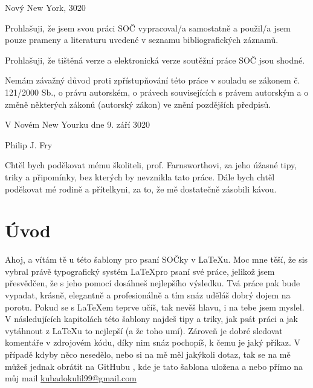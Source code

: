\documentclass[12pt, a4paper,
 twoside,        %
 openright
]{report}
\begin{document}
\noindent Nový New York, 3020

\cleardoublepage


\noindent Prohlašuji, že jsem svou práci SOČ vypracoval/a samostatně a použil/a jsem pouze prameny a literaturu uvedené v seznamu bibliografických záznamů.

\noindent Prohlašuji, že tištěná verze a elektronická verze soutěžní práce SOČ jsou shodné. 

\noindent Nemám závažný důvod proti zpřístupňování této práce v souladu se zákonem č. 121/2000 Sb., o právu autorském, o právech souvisejících s právem autorským a o změně některých zákonů (autorský zákon) ve znění pozdějších předpisů. 

\vspace{24 pt}

\noindent V Novém New Yourku dne 9. září 3020 \dotfill{} 

\hspace{8cm} Philip J. Fry

\cleardoublepage

\vspace*{0.8\textheight}

\noindent
Chtěl bych poděkovat mému školiteli, prof. Farnsworthovi, za jeho úžasné tipy, triky a připomínky, bez kterých by nevznikla tato práce. Dále bych chtěl poděkovat mé rodině a přítelkyni, za to, že mě dostatečně zásobili kávou.

\cleardoublepage

\tableofcontents

\pagestyle{fancy}
\setcounter{page}{1}

\chapter*{Úvod}
Ahoj,
a vítám tě u této šablony pro psaní SOČky v \LaTeX u. Moc mne těší, že sis vybral právě typografický systém \LaTeX pro psaní své práce, jelikož jsem přesvědčen, že s jeho pomocí dosáhneš nejlepšího výsledku. Tvá práce pak bude vypadat, krásně, elegantně a profesionálně a tím snáz uděláš dobrý dojem na porotu. Pokud se s \LaTeX em teprve učíš, tak nevěš hlavu, i na tebe jsem myslel. V následujících kapitolách této šablony najdeš tipy a triky, jak psát práci a jak vytáhnout z \LaTeX u to nejlepší (a že toho umí). Zároveň je dobré sledovat komentáře v zdrojovém kódu, díky nim snáz pochopíš, k čemu je jaký příkaz. V případě kdyby něco nesedělo, nebo si na mě měl jakýkoli dotaz, tak se na mě můžeš jednak obrátit na GitHubu \cite{sablonaSOC}, kde je tato šablona uložena  a nebo přímo na můj mail \url{kubadokulil99@gmail.com}
\end{document}

